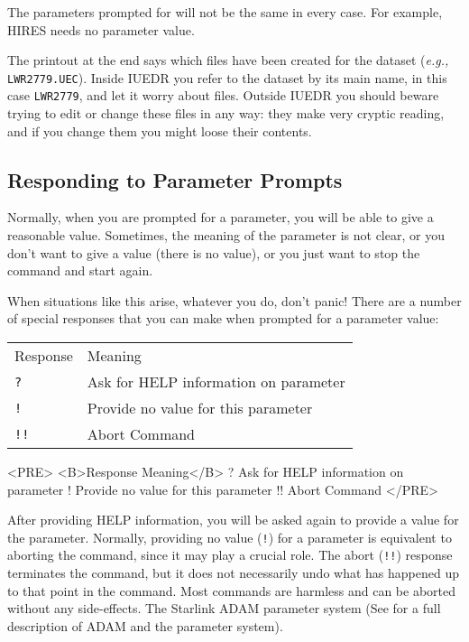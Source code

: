 The parameters prompted for will not be the same in every case.  For example,
HIRES needs no  parameter value.

The printout at the end says which files have been created for
the dataset ({\it{e.g.,}} \verb+LWR2779.UEC+)\@.  Inside IUEDR you refer to the
dataset by its main name, in this case \verb+LWR2779+, and let it worry about
files.  Outside IUEDR you should beware trying to edit or change these files
in any way: they make very cryptic reading, and if you change them you might
loose their contents.


\subsection{Responding to Parameter Prompts}

Normally, when you are prompted for a parameter, you will be able to give a
reasonable value.  Sometimes, the meaning of the parameter is not clear, or you
don't want to give a value (there is no value), or you just want to stop the
command and start again.

When situations like this arise, whatever you do, don't panic! There are a
number of special responses that you can make when prompted for a
parameter value:

\begin{latexonly}
\begin{tabular}{ll}
Response & Meaning\\
{\tt ?}  & Ask for HELP information on parameter\\
{\tt !}  & Provide no value for this parameter\\
{\tt !!} & Abort Command\\
\end{tabular}
\end{latexonly}

\begin{htmlonly}
\begin{rawhtml}
<PRE>
<B>Response  Meaning</B>
   ?      Ask for HELP information on parameter
   !      Provide no value for this parameter
   !!     Abort Command
</PRE>
\end{rawhtml}
\end{htmlonly}

After providing HELP information, you will be asked again to provide a value
for the parameter.  Normally, providing no value (\verb+!+) for a parameter is
equivalent to aborting the command, since it may play a crucial role.  The
abort (\verb+!!+) response terminates the command, but it does not necessarily
undo what has happened up to that point in the command.  Most commands are
harmless and can be aborted without any side-effects.  The Starlink ADAM
parameter system (See  for a full description of ADAM and
the parameter system)\@.



